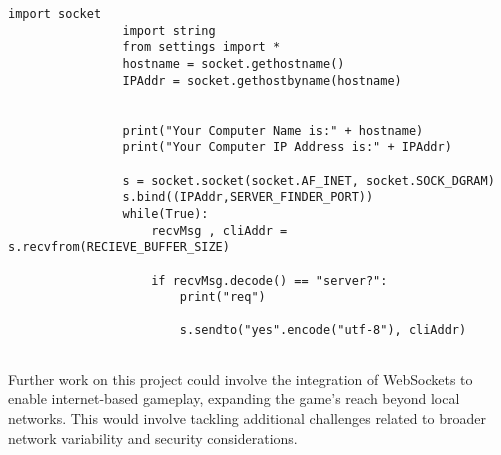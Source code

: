             \begin{lstlisting}[style=pythonstyle, caption=server assigner]
                import socket
                import string
                from settings import *
                hostname = socket.gethostname()
                IPAddr = socket.gethostbyname(hostname)
                
                 
                print("Your Computer Name is:" + hostname)
                print("Your Computer IP Address is:" + IPAddr)
                
                s = socket.socket(socket.AF_INET, socket.SOCK_DGRAM)
                s.bind((IPAddr,SERVER_FINDER_PORT))
                while(True):
                    recvMsg , cliAddr = s.recvfrom(RECIEVE_BUFFER_SIZE)
                
                    if recvMsg.decode() == "server?":
                        print("req")
                
                        s.sendto("yes".encode("utf-8"), cliAddr)
                
                \end{lstlisting}

        \newpage

Further work on this project could involve the integration of WebSockets to enable internet-based gameplay, expanding the game's reach beyond local networks. This would involve tackling additional challenges related to broader network variability and security considerations.